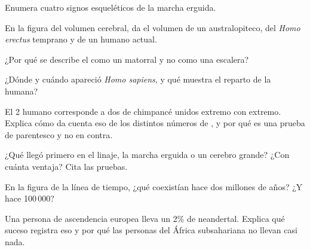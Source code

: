 \begin{exercise}[$\star$]\label{exo:g12:human-evolution:2}
Enumera cuatro signos esqueléticos de la marcha erguida.
\end{exercise}

\begin{exercise}[$\star$]\label{exo:g12:human-evolution:3}
En la figura del volumen cerebral, da el volumen de un australopiteco,
del \emph{Homo erectus} temprano y de un humano actual.
\end{exercise}

\begin{exercise}[$\star$]\label{exo:g12:human-evolution:4}
¿Por qué se describe el  como un matorral y no como una
escalera?
\end{exercise}

\begin{exercise}[$\star$]\label{exo:g12:human-evolution:5}
¿Dónde y cuándo apareció \emph{Homo sapiens}, y qué muestra el reparto
de la  humana?
\end{exercise}

\begin{exercise}[$\star\star$]\label{exo:g12:human-evolution:6}
El  2 humano corresponde a dos  de chimpancé unidos
extremo con extremo. Explica cómo da cuenta eso de los distintos
números de , y por qué es una prueba de parentesco y no en
contra.
\end{exercise}

\begin{exercise}[$\star\star$]\label{exo:g12:human-evolution:7}
¿Qué llegó primero en el linaje, la marcha erguida o un cerebro grande?
¿Con cuánta ventaja? Cita las pruebas.
\end{exercise}

\begin{exercise}[$\star\star$]\label{exo:g12:human-evolution:8}
En la figura de la línea de tiempo, ¿qué  coexistían hace dos
millones de años? ¿Y hace 100\,000?
\end{exercise}

\begin{exercise}[$\star\star$]\label{exo:g12:human-evolution:9}
Una persona de ascendencia europea lleva un 2\% de  neandertal.
Explica qué suceso registra eso y por qué las personas del África
subsahariana no llevan casi nada.
\end{exercise}

